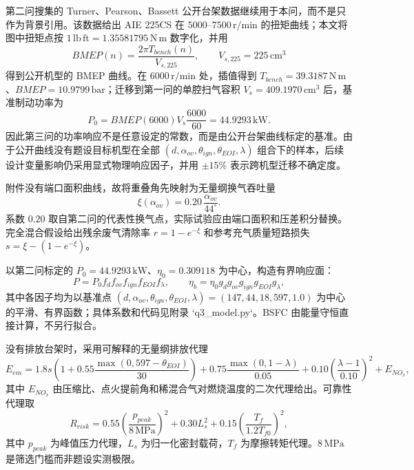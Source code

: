 第二问搜集的 Turner、Pearson、Bassett 公开台架数据继续用于本问，而不是只作为背景引用。该数据给出 AIE 225CS 在 $5000$--$7500\,\mathrm{r/min}$ 的扭矩曲线；本文将图中扭矩点按 $1\,\mathrm{lb\,ft}=1.35581795\,\mathrm{N\,m}$ 数字化，并用
\begin{equation}
 BMEP(n)=\frac{2\pi T_{bench}(n)}{V_{s,225}},\qquad V_{s,225}=225\,\mathrm{cm^3}
\end{equation}
得到公开机型的 BMEP 曲线。在 $6000\,\mathrm{r/min}$ 处，插值得到 $T_{bench}=39.3187\,\mathrm{N\,m}$、$BMEP=10.9799\,\mathrm{bar}$；迁移到第一问的单腔扫气容积 $V_s=409.1970\,\mathrm{cm^3}$ 后，基准制动功率为
\begin{equation}
 P_0=BMEP(6000)V_s\frac{6000}{60}=44.9293\,\mathrm{kW}.
\end{equation}
因此第三问的功率响应不是任意设定的常数，而是由公开台架曲线标定的基准。由于公开曲线没有题设目标机型在全部 $(d,\alpha_{ov},\theta_{ign},\theta_{EOI},\lambda)$ 组合下的样本，后续设计变量影响仍采用显式物理响应因子，并用 $\pm15\%$ 表示跨机型迁移不确定度。

附件没有端口面积曲线，故将重叠角先映射为无量纲换气吞吐量
\begin{equation}
 \xi(\alpha_{ov})=0.20\,\frac{\alpha_{ov}}{44^\circ}.
\end{equation}
系数 $0.20$ 取自第二问的代表性换气点，实际试验应由端口面积和压差积分替换。完全混合假设给出残余废气清除率 $r=1-e^{-\xi}$ 和参考充气质量短路损失 $s=\xi-(1-e^{-\xi})$。

以第二问标定的 $P_0=44.9293\,\mathrm{kW}$、$\eta_0=0.309118$ 为中心，构造有界响应面：
\begin{equation}
 P=P_0 f_d f_{ov}f_{ign}f_{EOI}f_\lambda,
 \qquad \eta_b=\eta_0 g_d g_{ov}g_{ign}g_{EOI}g_\lambda,
\end{equation}
其中各因子均为以基准点 $(d,\alpha_{ov},\theta_{ign},\theta_{EOI},\lambda)=(147,44,18,597,1.0)$ 为中心的平滑、有界函数；具体系数和代码见附录 `q3_model.py`。BSFC 由能量守恒直接计算，不另行拟合。

没有排放台架时，采用可解释的无量纲排放代理
\begin{equation}
 E_{em}=1.8s\left(1+0.55\frac{\max(0,597-\theta_{EOI})}{30}\right)
 +0.75\frac{\max(0,1-\lambda)}{0.05}+0.10\left(\frac{\lambda-1}{0.10}\right)^2+E_{NO_x},
\end{equation}
其中 $E_{NO_x}$ 由压缩比、点火提前角和稀混合气对燃烧温度的二次代理给出。可靠性代理取
\begin{equation}
 R_{risk}=0.55\left(\frac{p_{peak}}{8\,\mathrm{MPa}}\right)^2+0.30L_s^2+0.15\left(\frac{T_f}{1.2T_{f0}}\right)^2,
\end{equation}
其中 $p_{peak}$ 为峰值压力代理，$L_s$ 为归一化密封载荷，$T_f$ 为摩擦转矩代理。$8\,\mathrm{MPa}$ 是筛选门槛而非题设实测极限。

